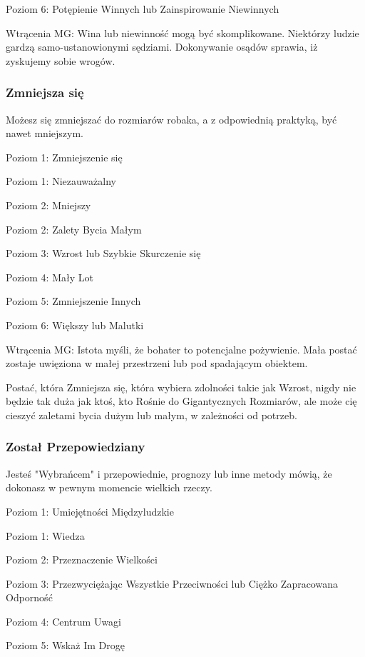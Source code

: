 Poziom 6: Potępienie Winnych lub Zainspirowanie Niewinnych

Wtrącenia MG: Wina lub niewinność mogą być skomplikowane. Niektórzy ludzie gardzą samo-ustanowionymi sędziami. Dokonywanie osądów sprawia, iż zyskujemy sobie wrogów. 

\subsubsection{Zmniejsza się}

Możesz się zmniejszać do rozmiarów robaka, a z odpowiednią praktyką, być nawet mniejszym.

Poziom 1: Zmniejszenie się

Poziom 1: Niezauważalny

Poziom 2: Mniejszy

Poziom 2: Zalety Bycia Małym

Poziom 3: Wzrost lub Szybkie Skurczenie się

Poziom 4: Mały Lot

Poziom 5: Zmniejszenie Innych

Poziom 6: Większy lub Malutki

Wtrącenia MG: Istota myśli, że bohater to potencjalne pożywienie. Mała postać zostaje uwięziona w małej przestrzeni lub pod spadającym obiektem.

Postać, która Zmniejsza się, która wybiera zdolności takie jak Wzrost, nigdy nie będzie tak duża jak ktoś, kto Rośnie do Gigantycznych Rozmiarów, ale może cię cieszyć zaletami bycia dużym lub małym, w zależności od potrzeb.

\subsubsection{Został Przepowiedziany}

Jesteś "Wybrańcem" i przepowiednie, prognozy lub inne metody mówią, że dokonasz w pewnym momencie wielkich rzeczy.

Poziom 1: Umiejętności Międzyludzkie

Poziom 1: Wiedza

Poziom 2: Przeznaczenie Wielkości

Poziom 3:  Przezwyciężając Wszystkie Przeciwności lub Ciężko Zapracowana Odporność

Poziom 4: Centrum Uwagi

Poziom 5: Wskaż Im Drogę


